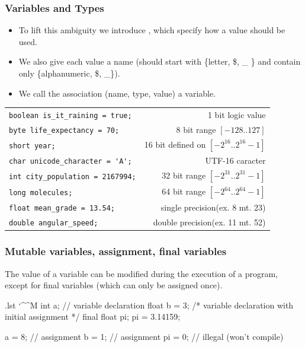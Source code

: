 \documentclass[10pt]{beamer}
\makeatletter
\newenvironment{code}{%
  \begingroup
  \@bsphack
  \immediate\openout\lstvrb@out\jobname.lst
  \let\do\@makeother\dospecials\catcode`\^^M\active
  \def\verbatim@processline{%
    \immediate\write\lstvrb@out{\the\verbatim@line}}%
  \verbatim@start}{%
  \immediate\closeout\lstvrb@out
  \@esphack
  \endgroup
  
  \begin{alertblock}{}
    
  \end{alertblock}}
\makeatother
\begin{document}
\begin{frame}[fragile]
  \frametitle{Variables and Types} 
  \begin{itemize}
  \item
  To lift this ambiguity we introduce ,
  which specify how a value should be used.
  \item
  We also give each value a name (should start with \{letter, \$, \_ \} and contain only \{alphanumeric, \$, \_\}).
  \item 
  We call the association (name, type, value) a variable.
  \end{itemize}

  \begin{example}
   \begin{longtable}{l|r}
   \lstinline!boolean is_it_raining = true;! & 1 bit logic value\\
   \pause
   \lstinline!byte life_expectancy = 70;! & 8 bit range $[-128..127]$ \\
   \lstinline!short year;! & 16 bit defined on $[-2^{16}..2^{16}-1]$ \\
   \lstinline!char unicode_character = 'A';! & UTF-16 caracter \\
   \pause 
   \lstinline!int city_population = 2167994;! & 32 bit range $[-2^{31}..2^{31}-1]$ \\ 
   \pause
   \lstinline!long molecules;! &  64 bit range $[-2^{64}..2^{64}-1]$ \\
   \hline
   \pause
   \lstinline!float mean_grade = 13.54;! & single precision(ex. 8 mt. 23) \\
   \lstinline!double angular_speed;! & double precision(ex. 11 mt. 52) \\ 
  \end{longtable}
\end{example}
\end{frame}


\begin{frame}[fragile]
  \frametitle{Mutable variables, assignment, final variables}
  
  The value of a variable can be modified during the execution of a program,
  except for final variables (which can only be assigned once). 

  \begin{code}
int a; // variable declaration
float b = 3; /* variable declaration with 
                initial assignment */
final float pi;
pi = 3.14159;

a = 8;  // assignment
b = 1;  // assignment
pi = 0; // illegal (won't compile) 
  \end{code}
\end{frame}
\end{document}
